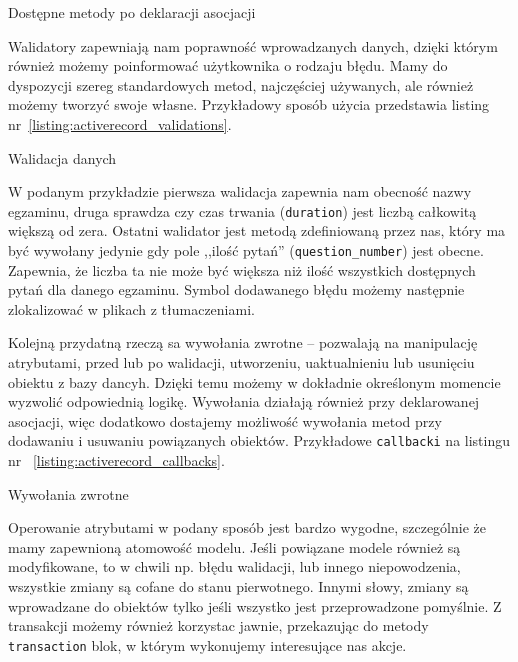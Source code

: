 \documentclass[12pt,twoside]{report}
\begin{document}
\begin{listing}
  
  \caption{Dostępne metody po deklaracji asocjacji}
  \label{listing:activerecord_association_finders}
\end{listing}


Walidatory zapewniają nam poprawność wprowadzanych danych, dzięki którym również
możemy poinformować użytkownika o rodzaju błędu. Mamy do dyspozycji szereg
standardowych metod, najczęściej używanych, ale również możemy tworzyć swoje
własne. Przykładowy sposób użycia przedstawia listing
nr~\ref{listing:activerecord_validations}.

\begin{listing}
  
  \caption{Walidacja danych}
  \label{listing:activerecord_validations}
\end{listing}


W podanym przykładzie pierwsza walidacja zapewnia nam obecność nazwy egzaminu,
druga sprawdza czy czas trwania (\texttt{duration}) jest liczbą całkowitą większą od
zera. Ostatni walidator jest metodą zdefiniowaną przez nas, który ma być
wywołany jedynie gdy pole ,,ilość pytań'' (\texttt{question\_number}) jest obecne.
Zapewnia, że liczba ta nie może być większa niż ilość wszystkich dostępnych
pytań dla danego egzaminu. Symbol dodawanego błędu możemy następnie zlokalizować
w plikach z tłumaczeniami.


Kolejną przydatną rzeczą sa wywołania zwrotne -- pozwalają na manipulację
atrybutami, przed lub po walidacji, utworzeniu, uaktualnieniu lub usunięciu
obiektu z bazy dancyh. Dzięki temu możemy w dokładnie określonym momencie
wyzwolić odpowiednią logikę. Wywołania działają również przy deklarowanej
asocjacji, więc dodatkowo dostajemy możliwość wywołania metod przy dodawaniu i
usuwaniu powiązanych obiektów. Przykładowe \texttt{callbacki} na listingu nr~
\ref{listing:activerecord_callbacks}.

\begin{listing}
  
  \caption{Wywołania zwrotne}
  \label{listing:activerecord_callbacks}
\end{listing}


Operowanie atrybutami w podany sposób jest bardzo wygodne, szczególnie że mamy
zapewnioną atomowość modelu. Jeśli powiązane modele również są modyfikowane, to
w chwili np. błędu walidacji, lub innego niepowodzenia, wszystkie zmiany są
cofane do stanu pierwotnego. Innymi słowy, zmiany są wprowadzane do obiektów
tylko jeśli wszystko jest przeprowadzone pomyślnie. Z transakcji możemy również
korzystac jawnie, przekazując do metody \texttt{transaction} blok, w którym
wykonujemy interesujące nas akcje.
\end{document}
